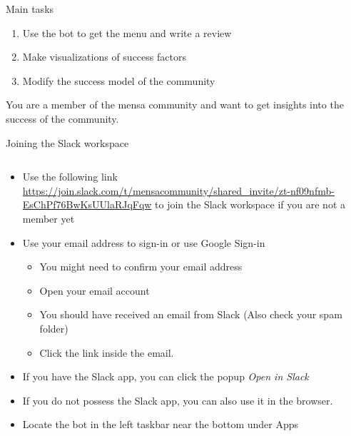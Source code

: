 \begin{frame}{Main tasks}
  \begin{enumerate}
    \item Use the bot to get the menu and write a review
    \item Make visualizations of success factors
    \item Modify the success model of the community
  \end{enumerate}
  
You are a member of the mensa community and want to get insights into the success of the community.

\end{frame}


\begin{frame}{Joining the Slack workspace}
  \begin{columns}
    \begin{column}[]{0.7\textwidth}
      \begin{itemize}
        \item Use the following link \\
         \url{https://join.slack.com/t/mensacommunity/shared_invite/zt-nf09nfmb-EsChPf76BwKsUUlaRJqFqw} to join the Slack workspace if you are not a member yet
        \item Use your email address to sign-in or use Google Sign-in
         \begin{itemize}
          \item You might need to confirm your email address
          \item Open your email account
          \item You should have received an email from Slack (Also check your spam folder)
          \item  Click the link inside the email. 
        \end{itemize}
       \item If you have the Slack app, you can click the popup \emph{Open in Slack}
        \item If you do not possess the Slack app, you can also use it in the browser.
        \item  Locate the bot in the left taskbar near the bottom under Apps
      \end{itemize}


\end{column}
\end{columns}
\end{frame}
